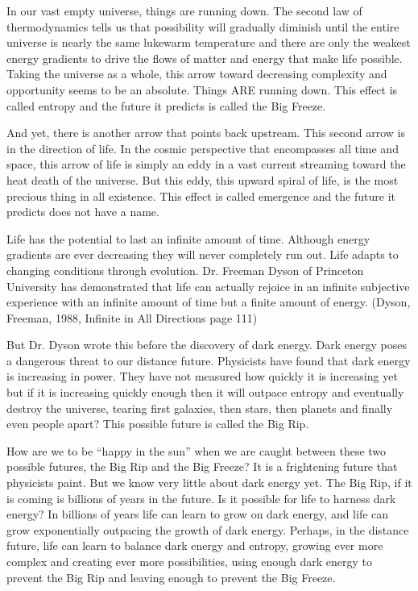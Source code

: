 \documentclass[ebook,11pt,openany,twoside]{memoir}
\begin{document}
In our vast empty universe, things are running down. The second law of
thermodynamics tells us that possibility will gradually diminish until the
entire universe is nearly the same lukewarm temperature and there are only the
weakest energy gradients to drive the flows of matter and energy that make life
possible. Taking the universe as a whole, this arrow toward decreasing
complexity and opportunity seems to be an absolute. Things ARE running down.
This effect is called entropy and the future it predicts is called the Big
Freeze.

And yet, there is another arrow that points back upstream. This second arrow is
in the direction of life. In the cosmic perspective that encompasses all time
and space, this arrow of life is simply an eddy in a vast current streaming
toward the heat death of the universe. But this eddy, this upward spiral of
life, is the most precious thing in all existence. This effect is called
emergence and the future it predicts does not have a name.

Life has the potential to last an infinite amount of time. Although energy
gradients are ever decreasing they will never completely run out. Life adapts
to changing conditions through evolution. Dr. Freeman Dyson of Princeton
University has demonstrated that life can actually rejoice in an infinite
subjective experience with an infinite amount of time but a finite amount of
energy. (Dyson, Freeman, 1988, Infinite in All Directions page 111)

But Dr. Dyson wrote this before the discovery of dark energy. Dark energy poses
a dangerous threat to our distance future. Physicists have found that dark
energy is increasing in power. They have not measured how quickly it is
increasing yet but if it is increasing quickly enough then it will outpace
entropy and eventually destroy the universe, tearing first galaxies, then
stars, then planets and finally even people apart? This possible future is
called the Big Rip.

How are we to be ``happy in the sun'' when we are caught between these two
possible futures, the Big Rip and the Big Freeze? It is a frightening future
that physicists paint. But we know very little about dark energy yet. The Big
Rip, if it is coming is billions of years in the future. Is it possible for
life to harness dark energy? In billions of years life can learn to grow on
dark energy, and life can grow exponentially outpacing the growth of dark
energy. Perhaps, in the distance future, life can learn to balance dark energy
and entropy, growing ever more complex and creating ever more possibilities,
using enough dark energy to prevent the Big Rip and leaving enough to prevent
the Big Freeze.
\end{document}
